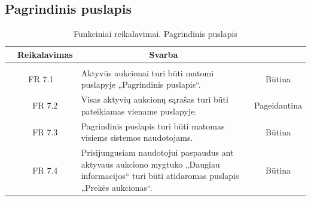 \documentclass{VUMIFPSkursinis}
\begin{document}
	\subsection{Pagrindinis puslapis}
	\begin{table}[H]
		\caption{Funkciniai reikalavimai. Pagrindinis puslapis}
		\begin{tabular}{|p{1cm}|p{1cm}|p{}|p{}|}
			\hline 
			\rowcolor{gray!50}
			\multicolumn{2}{|c|}{{\bfseries Kodas}}&
			\multicolumn{1}{c|}{{\bfseries Reikalavimas}}&
			\multicolumn{1}{c|}{{\bfseries Svarba}}\\
			\hline
			\rowcolor{lightgray}
			\multicolumn{4}{|c|}{Pagrindinis puslapis}\\		
			
			\hline
			\multicolumn{2}{|c|}{FR 7.1}&
			{Aktyvūs aukcionai turi būti matomi puslapyje „Pagrindinis puslapis“.
			}&		
			\multicolumn{1}{c|}{Būtina}\\
			\hline
			\multicolumn{1}{|c}{}&
			\multicolumn{1}{c|}{FR 7.2}&
			{Visas aktyvių aukcionų sąrašas turi būti pateikiamas viename puslapyje.
			}&		
			\multicolumn{1}{c|}{Pageidautina}\\
			\hline	
			\multicolumn{1}{|c}{}&
			\multicolumn{1}{c|}{FR 7.3}&
			{Pagrindinis puslapis turi būti matomas visiems sistemos naudotojams.
			}&
			\multicolumn{1}{c|}{Būtina}\\									
			\hline
			\multicolumn{1}{|c}{}&
			\multicolumn{1}{c|}{FR 7.4}&
			{Prisijungusiam naudotojui paspaudus ant aktyvaus aukciono mygtuko „Daugiau informacijos“ turi būti atidaromas puslapis „Prekės aukcionas“.
			}&
			\multicolumn{1}{c|}{Būtina}\\									
			\hline
		\end{tabular}		
	\end{table}
	
\end{document}
